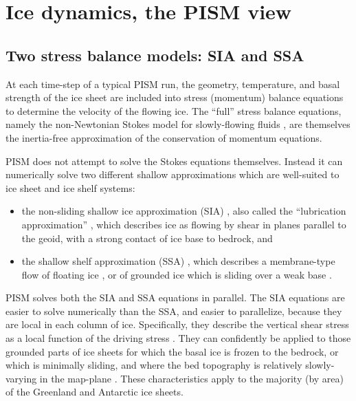 \section{Ice dynamics, the PISM view}\label{sec:dynamics}

\subsection{Two stress balance models: SIA and SSA}  At each time-step of a typical PISM run, the geometry, temperature, and basal strength of the ice sheet are included into stress (momentum) balance equations to determine the velocity of the flowing ice.   The ``full'' stress balance equations, namely the non-Newtonian Stokes model for slowly-flowing fluids \cite{Fowler}, are themselves the inertia-free approximation of the conservation of momentum equations.

PISM does not attempt to solve the Stokes equations themselves.  Instead it can numerically solve two different shallow approximations which are well-suited to ice sheet and ice shelf systems:
\begin{itemize}
\item the non-sliding shallow ice approximation (SIA) \cite{Hutter}, also called the ``lubrication approximation'' \cite{Fowler}, which describes ice as flowing by shear in planes parallel to the geoid, with a strong contact of ice base to bedrock, and
\item the shallow shelf approximation (SSA) \cite{WeisGreveHutter}, which describes a membrane-type flow of floating ice \cite{Morland}, or of grounded ice which is sliding over a weak base \cite{MacAyeal,SchoofStream}.
\end{itemize}

PISM solves both the SIA and SSA equations in parallel.  The SIA equations are easier to solve numerically than the SSA, and easier to parallelize, because they are local in each column of ice.  Specifically, they describe the vertical shear stress as a local function of the driving stress \cite{Paterson}.  They can confidently be applied to those grounded parts of ice sheets for which the basal ice is frozen to the bedrock, or which is minimally sliding, and where the bed topography is relatively slowly-varying in the map-plane \cite{Fowler}.  These characteristics apply to the majority (by area) of the Greenland and Antarctic ice sheets.

